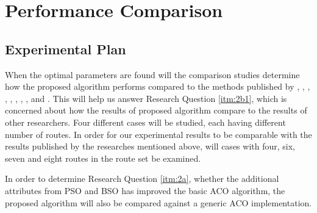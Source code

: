 \section{Performance Comparison}
\label{sec:performanceComparison}
\subsection{Experimental Plan}
When the optimal parameters are found will the comparison studies determine how the proposed algorithm performs compared to the methods published by \citet{mandl79}, \citet{kechagiopoulos14}, \citet{nikolic14}, \citet{kidwai98}, \citet{fan10}, \citet{chakroborty02}, \citet{zhang10}, \citet{chew12}, and \citet{baaj91}. This will help us answer Research Question \vref{itm:2b1}, which is concerned about how the results of proposed algorithm compare to the results of other researchers. Four different cases will be studied, each having different number of routes. In order for our experimental results to be comparable with the results published by the researches mentioned above, will cases with four, six, seven and eight routes in the route set be examined.

In order to determine Research Question \vref{itm:2a}, whether the additional attributes from PSO and BSO has improved the basic ACO algorithm, the proposed algorithm will also be compared against a generic ACO implementation.


